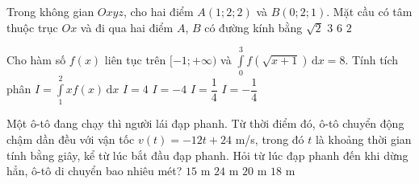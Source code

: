 \begin{ex}%
	Trong không gian $Oxyz$, cho hai điểm $A(1;2;2)$ và $B(0;2;1)$. Mặt cầu có tâm thuộc trục $Ox$ và đi qua hai điểm $A$, $B$ có đường kính bằng
	\choice
	{$\sqrt{2}$}
	{$3$}
	{\True $6$}
	{$2$}
\end{ex}
\begin{ex}%
	Cho hàm số $f(x)$ liên tục trên $[-1;+\infty)$ và $\displaystyle\int\limits_0^3f\left(\sqrt{x+1}\right)\mathrm{\,d}x=8$. Tính tích phân $I=\displaystyle\int\limits_1^2xf(x)\mathrm{\,d}x$
	\choice
	{\True $I=4$}
	{$I=-4$}
	{$I=\dfrac{1}{4}$}
	{$I=-\dfrac{1}{4}$}
\end{ex}
\begin{ex}%
	Một ô-tô đang chạy thì người lái đạp phanh. Từ thời điểm đó, ô-tô chuyển động chậm dần đều với vận tốc $v(t)=-12t+24$ m/s, trong đó $t$ là khoảng thời gian tính bằng giây, kể từ lúc bắt đầu đạp phanh. Hỏi từ lúc đạp phanh đến khi dừng hẳn, ô-tô di chuyển bao nhiêu mét?
	\choice
	{$15$ m}
	{\True $24$ m}
	{$20$ m}
	{$18$ m}
\end{ex}
